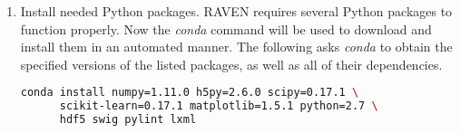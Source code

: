 \begin{enumerate}
\begin{lstlisting}[language=bash, basicstyle=\tiny]
\end{lstlisting}

	\item Install needed Python packages.  RAVEN requires several Python packages to function properly.
		Now the {\it conda} command will be used to download and install them in an automated manner. The
		following asks {\it conda} to obtain the specified versions of the listed packages, as well as all
		of their dependencies.
		\smallskip

    \begin{lstlisting}[language=bash]
    conda install numpy=1.11.0 h5py=2.6.0 scipy=0.17.1 \
      scikit-learn=0.17.1 matplotlib=1.5.1 python=2.7 \
      hdf5 swig pylint lxml
    \end{lstlisting}

\end{enumerate}

